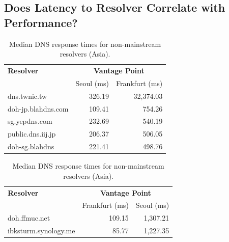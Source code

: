 \subsection{Does Latency to Resolver Correlate with Performance?}

\begin{table}[t!]
\hspace*{-0.75in}
\begin{minipage}{1.25\linewidth}
\parbox{0.45\linewidth}{
\begin{scriptsize}
\centering
\begin{tabular}{l|rr}
\toprule
    \textbf{Resolver} & \multicolumn{2}{c}{\textbf{Vantage Point}} \\
                  & \textrm{Seoul (ms)}         & \textrm{Frankfurt (ms)} \\
\midrule
dns.twnic.tw                                & 326.19 & 32,374.03                            \\
doh-jp.blahdns.com                          & 109.41                                           & 754.26                              \\
sg.yepdns.com                               & 232.69                                           & 540.19                              \\
public.dns.iij.jp                           & 206.37                                           & 506.05                              \\
doh-sg.blahdns                              & 221.41                                           & 498.76                              \\
\bottomrule
\end{tabular}
\end{scriptsize}
    \caption{Median DNS response times for non-mainstream resolvers (Asia).}
\label{tab:UnconvAsia}
}\hfill
\centering
\parbox{0.45\linewidth}{
\begin{scriptsize}
\begin{tabular}{l|rr}
\toprule
\textbf{Resolver} & \multicolumn{2}{c}{\textbf{Vantage Point}} \\
                  & \textrm{Frankfurt (ms)}     & \textrm{Seoul (ms)} \\
\midrule
doh.ffmuc.net                               & 109.15 & 1,307.21                         \\
ibksturm.synology.me                        & 85.77 & 1,227.35                         \\

\end{tabular}
\end{scriptsize}}
\end{minipage}
\end{table}
